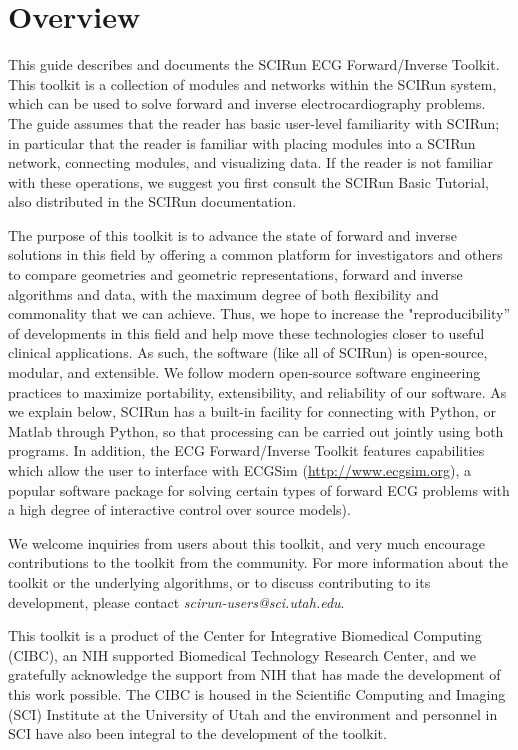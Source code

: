 \chapter{Overview}

\begin{introduction}

This guide describes and documents the SCIRun ECG Forward/Inverse
Toolkit. This toolkit is a collection of modules and networks
within the SCIRun system, which can be used to solve forward and inverse
electrocardiography problems. The guide assumes that the reader has basic
user-level familiarity with SCIRun; in particular that the reader is
familiar with placing modules into a SCIRun network, connecting modules,
and visualizing data. If the reader is not familiar with these operations,
we suggest you first consult the SCIRun Basic Tutorial, also distributed in
the SCIRun documentation.

The purpose of this toolkit is to advance the state of forward and inverse
solutions in this field by offering a common platform for investigators and
others to compare geometries and geometric representations, forward and inverse algorithms and data, with the maximum degree of both flexibility
and commonality that we can achieve. Thus, we hope to increase the
"reproducibility'' of developments in this field and help
move these technologies closer to useful clinical applications. As such, the
software (like all of SCIRun) is open-source, modular, and extensible. We
follow modern open-source software engineering practices to maximize
portability, extensibility, and reliability of our software. As we explain below, SCIRun has a
built-in facility for connecting with Python, or Matlab through Python, so that processing can be
carried out jointly using both programs. In
addition, the ECG Forward/Inverse Toolkit features capabilities which allow
the user to interface with ECGSim (\href{http://www.ecgsim.org}{http://www.ecgsim.org}), a
popular software package for solving certain types of forward ECG problems
with a high degree of interactive control over source models).

We welcome inquiries from users about this toolkit, and very much encourage
contributions to the toolkit from the community. For more information
about the toolkit or the underlying algorithms, or to discuss contributing to
its development, please contact \textit{scirun-users@sci.utah.edu}.

This toolkit is a product of the Center for Integrative Biomedical
Computing (CIBC), an NIH supported Biomedical Technology Research Center,
and we gratefully acknowledge the support from NIH that has made the
development of this work possible. The CIBC is housed in the Scientific
Computing and Imaging (SCI) Institute at the University of Utah and the
environment and personnel in SCI have also been integral to the development of the toolkit.

\end{introduction}

